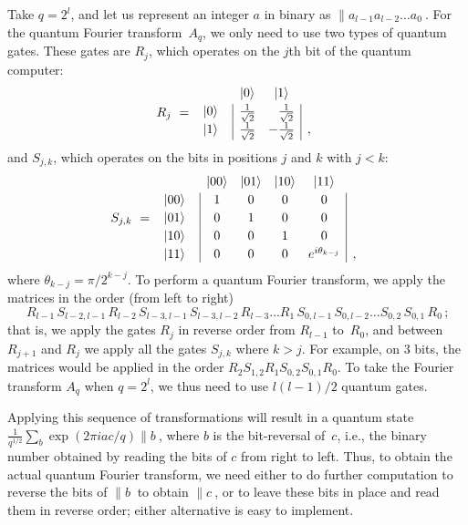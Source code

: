 Take $q=2^l$, and let us represent an integer $a$ in binary as
$\|a_{l-1}a_{l-2}\ldots a_0\>$.
For the quantum Fourier transform~$A_q$, we only need to use two types of 
quantum gates.  These gates are $R_j$, which operates on the $j$th
bit of the quantum computer:
\begin{equation}
R_j \ = \ 
\begin{array}{c|cc|l}
\multicolumn{1}{c}{} & \|0\> & \multicolumn{1}{c}{\|1\>} & \\*[.5ex]
\|0\> \ \  & \frac{1}{\sqrt{2}} & \phantom{-} \frac{1}{\sqrt{2}} & \\*[.5ex]
\|1\> \ \  & \frac{1}{\sqrt{2}}  & -\frac{1}{\sqrt{2}}& ,
\end{array}
\label{Rmatrix}
\end{equation}
and
$S_{j,k}$, which operates on the bits in positions $j$ and $k$ with $j < k$:
\begin{equation}
S_{j,k} \ = \ 
\begin{array}{c|cccc|l}
\multicolumn{1}{c}{} & \|00\> & \|01\> & \|10\> & 
                      \multicolumn{1}{c}{\|11\>} & \\*[.5ex]
\|00\> \ \  & 1 & 0 & 0 & 0 & \\*[.5ex]
\|01\> \ \  & 0 & 1 & 0 & 0 & \\*[.5ex]
\|10\> \ \  & 0 & 0 & 1 & 0 & \\*[.5ex]
\|11\> \ \  & 0 & 0 & 0 & e^{i\theta_{k-j}} & ,
\end{array}
\label{Smatrix}
\end{equation}
where $\theta_{k-j} = \pi/2^{k-j}$.
To perform a quantum Fourier transform, we apply the matrices in the
order (from left to right)
\begin{equation}
\, R_{l-1}\, S_{l-2,l-1}\, R_{l-2}\, S_{l-3,l-1}\, S_{l-3,l-2}\, R_{l-3} 
\ldots R_1 \,S_{0,l-1}\, S_{0,l-2} \ldots S_{0,2}\, S_{0,1}\, R_0\, ;
\end{equation}
that is, we apply the gates $R_j$ in reverse order from $R_{l-1}$ to~$R_0$,
and between $R_{j+1}$ and $R_j$ we apply all the gates $S_{j,k}$ where $k>j$.
For example, on 3 bits, the matrices would be applied in the order
$R_2 S_{1,2} R_1 S_{0,2} S_{0,1} R_0$.  
To take the Fourier transform
$A_q$ when $q=2^l$, we thus need to use $l(l-1)/2$ quantum gates.

Applying this sequence of transformations will result in a quantum state 
$\frac{1}{q^{1/2}} \sum_b \exp(2 \pi i ac /q) \|b\>$, 
where $b$ is the bit-reversal of~$c$,
i.e., the binary number obtained by reading the bits of $c$ from right 
to left.  Thus, to obtain the actual quantum Fourier transform, we need 
either to do further computation to
reverse the bits of $\|b\>$ to obtain $\|c\>$, or to leave these bits
in place and read them in reverse order; either alternative is easy
to implement. 

